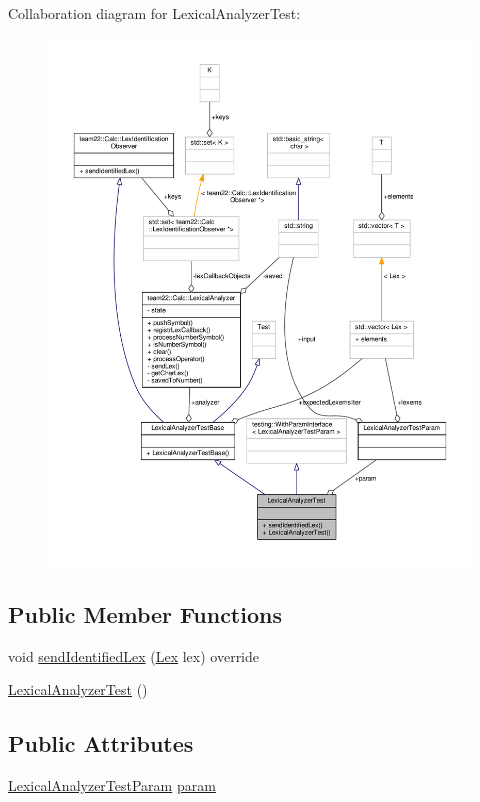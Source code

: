 Collaboration diagram for Lexical\+Analyzer\+Test\+:
\nopagebreak
\begin{figure}[H]
\begin{center}
\leavevmode
\includegraphics[width=350pt]{struct_lexical_analyzer_test__coll__graph}
\end{center}
\end{figure}
\subsection*{Public Member Functions}
\begin{DoxyCompactItemize}
\item 
void \hyperlink{struct_lexical_analyzer_test_a1c412feae956dcdc6ca0519e361e8f64}{send\+Identified\+Lex} (\hyperlink{classteam22_1_1_calc_1_1_lex}{Lex} lex) override
\item 
\hyperlink{struct_lexical_analyzer_test_a2d6000048baf250c1b0d6215f9760a92}{Lexical\+Analyzer\+Test} ()
\end{DoxyCompactItemize}
\subsection*{Public Attributes}
\begin{DoxyCompactItemize}
\item 
\hyperlink{struct_lexical_analyzer_test_param}{Lexical\+Analyzer\+Test\+Param} \hyperlink{struct_lexical_analyzer_test_ad6d61cc18154fb0f6b92eb10d840dc35}{param}
\end{DoxyCompactItemize}


